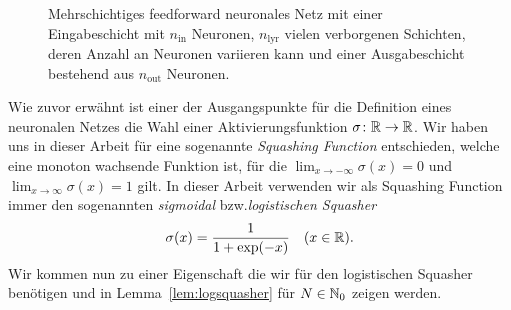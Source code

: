 \begin{center}
\begin{figure}
        \caption{Mehrschichtiges feedforward neuronales Netz mit einer Eingabeschicht mit $n_{\mathrm{in}}$ Neuronen, $n_{\mathrm{lyr}}$ vielen verborgenen Schichten, deren Anzahl an Neuronen variieren kann und einer Ausgabeschicht bestehend aus $n_{\mathrm{out}}$ Neuronen.}
        \label{fig:DNN}
    \end{figure}
\end{center}
Wie zuvor erwähnt ist einer der Ausgangspunkte für die Definition eines neuronalen Netzes die Wahl einer Aktivierungsfunktion $\sigma\colon \mathbb{R} \to \mathbb{R}$. Wir haben uns in dieser Arbeit für eine sogenannte \textit{Squashing Function} entschieden, welche eine monoton wachsende Funktion ist, für die $\lim_{x \to -\infty}\sigma(x) = 0$ und $\lim_{x \to \infty}\sigma(x) = 1$ gilt. In dieser Arbeit verwenden wir als Squashing Function immer den sogenannten \emph{sigmoidal} bzw.\@ \emph{logistischen Squasher}
\begin{align}
\label{logsquasher}
\sigma(x) = \frac{1}{1 + \exp(-x)} \quad (x \in \mathbb{R}).
\end{align}
Wir kommen nun zu einer Eigenschaft die wir für den logistischen Squasher benötigen und in Lemma~\ref{lem:logsquasher} für $N \in \mathbb{N}_0$ zeigen werden.
